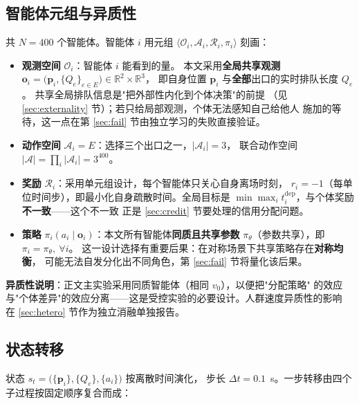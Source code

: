 \subsection{智能体元组与异质性}
\label{sec:agent}

共 $N=400$ 个智能体。智能体 $i$ 用元组
$\langle \mathcal O_i,\mathcal A_i,\mathcal R_i,\pi_i\rangle$ 刻画：

\begin{itemize}
  \item \textbf{观测空间} $\mathcal O_i$：智能体 $i$ 能看到的量。
        本文采用\textbf{全局共享观测}
        $\mathbf o_i=\bigl(\mathbf p_i,\{Q_e\}_{e\in E}\bigr)\in\mathbb R^{2}\times\mathbb R^{3}$，
        即自身位置 $\mathbf p_i$ 与\textbf{全部}出口的实时排队长度 $Q_e$。
        共享全局排队信息是"把外部性内化到个体决策"的前提
        （见 \ref{sec:externality} 节）；若只给局部观测，个体无法感知自己给他人
        施加的等待，这一点在第 \ref{sec:fail} 节由独立学习的失败直接验证。
  \item \textbf{动作空间} $\mathcal A_i=E$：选择三个出口之一，$|\mathcal A_i|=3$，
        联合动作空间 $|\mathcal A|=\prod_i|\mathcal A_i|=3^{400}$。
  \item \textbf{奖励} $\mathcal R_i$：采用单元组设计，每个智能体只关心自身离场时刻，
        $r_i=-1$（每单位时间步），即最小化自身疏散时间。全局目标是
        $\min \max_i t_i^{\text{dep}}$，与个体奖励\textbf{不一致}——这个不一致
        正是 \ref{sec:credit} 节要处理的信用分配问题。
  \item \textbf{策略} $\pi_i(a_i\mid \mathbf o_i)$：本文所有智能体\textbf{同质且共享参数}
        $\pi_\theta$（参数共享），即 $\pi_i=\pi_\theta,\ \forall i$。
        这一设计选择有重要后果：在对称场景下共享策略存在\textbf{对称均衡}，
        可能无法自发分化出不同角色，第 \ref{sec:fail} 节将量化该后果。
\end{itemize}

\textbf{异质性说明}：正文主实验采用同质智能体（相同 $v_0$），以便把"分配策略"
的效应与"个体差异"的效应分离——这是受控实验的必要设计。人群速度异质性的影响
在 \ref{sec:hetero} 节作为独立消融单独报告。

\subsection{状态转移}
\label{sec:transition}

状态 $s_t=\bigl(\{\mathbf p_i\},\{Q_e\},\{a_i\}\bigr)$ 按离散时间演化，
步长 $\Delta t=0.1$~s。一步转移由四个子过程按固定顺序复合而成：

